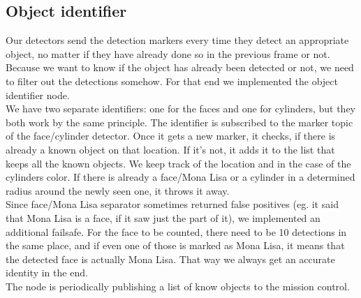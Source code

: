\documentclass[a4paper,
  twoside, %
  headlines=2.1 %
  ]{scrartcl}
\begin{document}
\subsection{Object identifier}
Our detectors send the detection markers every time they detect an appropriate object, no matter if they have already done so in the previous frame or not. Because we want to know if the object has already been detected or not, we need to filter out the detections somehow. For that end we implemented the object identifier node.\\
We have two separate identifiers: one for the faces and one for cylinders, but they both work by the same principle. The identifier is subscribed to the marker topic of the face/cylinder detector. Once it gets a new marker, it checks, if there is already a known object on that location. If it's not, it adds it to the list that keeps all the known objects. We keep track of the location and in the case of the cylinders color. If there is already a face/Mona Lisa or a cylinder in a determined radius around the newly seen one, it throws it away.\\
Since face/Mona Lisa separator sometimes returned false positives (eg. it said that Mona Lisa is a face, if it saw just the part of it), we implemented an additional failsafe. For the face to be counted, there need to be 10 detections in the same place, and if even one of those is marked as Mona Lisa, it means that the detected face is actually Mona Lisa. That way we always get an accurate identity in the end.\\
The node is periodically publishing a list of know objects to the mission control.
\end{document}
